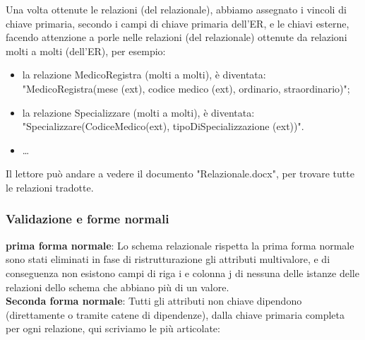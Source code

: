 \documentclass[11pt]{article}
\begin{document}
Una volta ottenute le relazioni (del relazionale), abbiamo assegnato i vincoli di chiave primaria, secondo i campi di chiave primaria dell'ER, e le chiavi esterne, facendo attenzione a porle nelle relazioni (del relazionale) ottenute da relazioni molti a molti (dell'ER), per esempio:
\begin{itemize}
    \item la relazione MedicoRegistra (molti a molti), è diventata: "MedicoRegistra(mese (ext), codice medico (ext), ordinario, straordinario)";
    \item la relazione Specializzare (molti a molti), è diventata: "Specializzare(CodiceMedico(ext), tipoDiSpecializzazione (ext))".
    \item \dots
\end{itemize}

Il lettore può andare a vedere il documento "Relazionale.docx", per trovare tutte le relazioni tradotte.

\subsubsection{Validazione e forme normali}
\textbf{prima forma normale}: Lo schema relazionale rispetta la prima forma normale sono stati eliminati in fase di ristrutturazione gli attributi multivalore, 
e di conseguenza non esistono campi di riga i e colonna j di nessuna delle istanze delle relazioni dello schema che abbiano più di un valore.\\

\textbf{Seconda forma normale}: Tutti gli attributi non chiave dipendono (direttamente o tramite catene di dipendenze), dalla chiave primaria completa per ogni relazione, qui scriviamo le più articolate:
\end{document}
